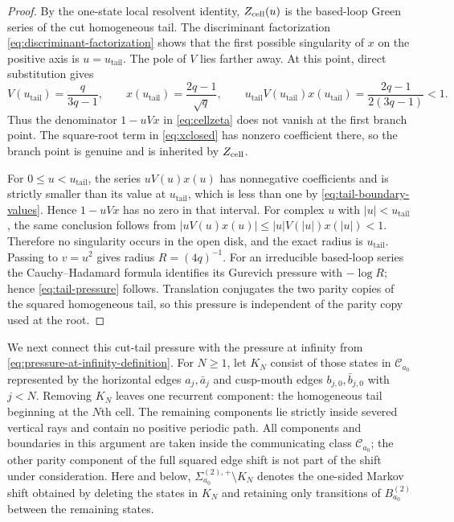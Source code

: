 \documentclass[11pt,reqno]{amsart}
\numberwithin{equation}{section}
\theoremstyle{definition}
\theoremstyle{remark}
\newcommand{\cC}{\mathcal C}
\begin{document}
\begin{proof}
By the one-state local resolvent identity,
$Z_{\rm cell}(u)$ is the based-loop Green series of the cut homogeneous tail.
The discriminant factorization
\eqref{eq:discriminant-factorization} shows that the first possible
singularity of $x$ on the positive axis is
$u=u_{\mathrm{tail}}$.  The pole of $V$ lies farther away.  At this point,
direct substitution gives
\begin{equation}\label{eq:tail-boundary-values}
 V(u_{\mathrm{tail}})=\frac q{3q-1},
 \qquad
 x(u_{\mathrm{tail}})=\frac{2q-1}{\sqrt q},
 \qquad
 u_{\mathrm{tail}}V(u_{\mathrm{tail}})x(u_{\mathrm{tail}})
 =\frac{2q-1}{2(3q-1)}<1.
\end{equation}
Thus the denominator $1-uVx$ in \eqref{eq:cellzeta} does not vanish at the
first branch point.  The square-root term in \eqref{eq:xclosed} has nonzero
coefficient there, so the branch point is genuine and is inherited by
$Z_{\rm cell}$.

For $0\le u<u_{\mathrm{tail}}$, the series $uV(u)x(u)$ has nonnegative
coefficients and is strictly smaller than its value at
$u_{\mathrm{tail}}$, which is less than one by
\eqref{eq:tail-boundary-values}.  Hence $1-uVx$ has no zero in that interval.
For complex $u$ with $|u|<u_{\mathrm{tail}}$, the same conclusion follows
from
$|uV(u)x(u)|\le |u|V(|u|)x(|u|)<1$.  Therefore no singularity occurs in the
open disk, and the exact radius is $u_{\mathrm{tail}}$.  Passing to
$v=u^2$ gives radius $R=(4q)^{-1}$.  For an irreducible based-loop series the
Cauchy--Hadamard formula identifies its Gurevich pressure with $-\log R$;
hence \eqref{eq:tail-pressure} follows.  Translation
conjugates the two parity copies of the squared homogeneous tail, so this
pressure is independent of the parity copy used at the root.
\end{proof}

We next connect this cut-tail pressure with the pressure at infinity from
\eqref{eq:pressure-at-infinity-definition}.  For $N\ge1$, let $K_N$ consist
of those states in $\cC_{a_0}$ represented by the horizontal edges
$a_j,\bar a_j$ and cusp-mouth edges $b_{j,0},\bar b_{j,0}$ with $j<N$.
Removing $K_N$ leaves one recurrent component: the homogeneous tail beginning
at the $N$th cell.  The remaining components lie strictly inside severed
vertical rays and contain no positive periodic path.  All components and
boundaries in this argument are taken inside the communicating class
$\cC_{a_0}$; the other parity component of the full squared edge shift is not
part of the shift under consideration.
Here and below,
$\Sigma^{(2),+}_{a_0}\setminus K_N$ denotes the one-sided Markov shift
obtained by deleting the states in $K_N$ and retaining only transitions of
$B^{(2)}_{a_0}$ between the remaining states.
\end{document}
